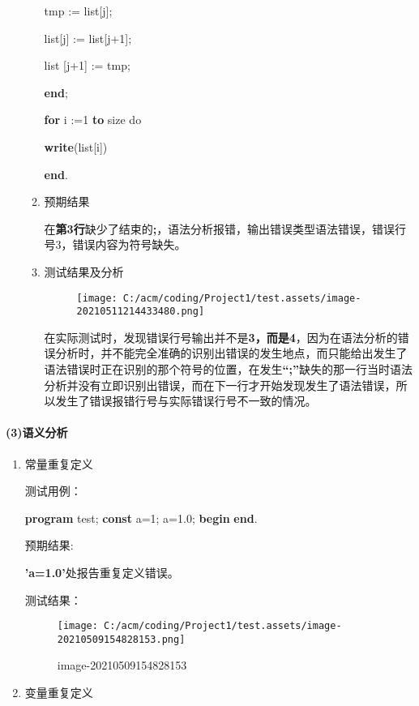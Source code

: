 \documentclass[]{ctexart}
\newenvironment{Shaded}{}{}
\newcommand{\DecValTok}[1]{\textcolor[rgb]{0.25,0.63,0.44}{#1}}
\newcommand{\KeywordTok}[1]{\textcolor[rgb]{0.00,0.44,0.13}{\textbf{#1}}}
\newcommand{\NormalTok}[1]{#1}
\let\oldparagraph\paragraph
\renewcommand{\paragraph}[1]{\oldparagraph{#1}\mbox{}}
\begin{document}
\begin{enumerate}
\begin{enumerate}
\begin{Shaded}
\begin{Highlighting}[]
\NormalTok{		    tmp := list[j];
}
\NormalTok{		    list[j] := list[j+}\DecValTok{1}\NormalTok{];
}
\NormalTok{		    list [j+}\DecValTok{1}\NormalTok{] := tmp;
}
	    \KeywordTok{end}\NormalTok{;
}


    \KeywordTok{for}\NormalTok{ i :=}\DecValTok{1} \KeywordTok{to}\NormalTok{ size do
}
	\KeywordTok{write}\NormalTok{(list[i])
}
\KeywordTok{end}\NormalTok{.}
\end{Highlighting}
\end{Shaded}
  \item
    预期结果

    在\textbf{第3行}缺少了结束的\textbf{;}，语法分析报错，输出错误类型语法错误，错误行号3，错误内容为符号缺失。
  \item
    测试结果及分析

    \begin{figure}
    \centering
    \texttt{[image: C:/acm/coding/Project1/test.assets/image-20210511214433480.png]}
    \caption{}
    \end{figure}

    在实际测试时，发现错误行号输出并不是\textbf{3，而是4}，因为在语法分析的错误分析时，并不能完全准确的识别出错误的发生地点，而只能给出发生了语法错误时正在识别的那个符号的位置，在发生\textbf{``;''}缺失的那一行当时语法分析并没有立即识别出错误，而在下一行才开始发现发生了语法错误，所以发生了错误报错行号与实际错误行号不一致的情况。
  \end{enumerate}
\end{enumerate}

\hypertarget{header-n287}{%
\paragraph{(3)语义分析 }\label{header-n287}}

\begin{enumerate}
\def\labelenumi{\arabic{enumi}.}
\item
  常量重复定义

  测试用例：

\begin{Shaded}
\begin{Highlighting}[]
\KeywordTok{program}\NormalTok{ test;}
\KeywordTok{const}
\NormalTok{    a=}\DecValTok{1}\NormalTok{;}
\NormalTok{    a=}\DecValTok{1.0}\NormalTok{;}
\KeywordTok{begin}
\KeywordTok{end}\NormalTok{.}
\end{Highlighting}
\end{Shaded}

  预期结果:

  \textbf{'a=1.0'}处报告重复定义错误。

  测试结果：

  \begin{figure}
  \centering
  \texttt{[image: C:/acm/coding/Project1/test.assets/image-20210509154828153.png]}
  \caption{image-20210509154828153}
  \end{figure}
\item
  变量重复定义
\end{enumerate}
\end{document}
